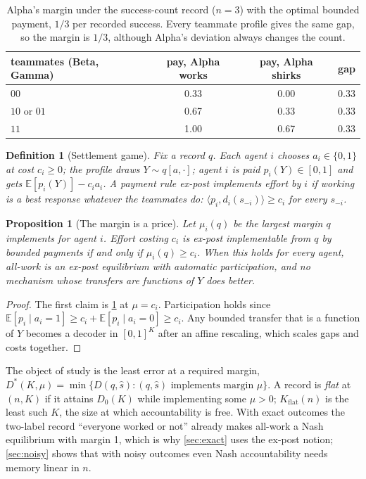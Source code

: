 \documentclass[sigconf,anonymous,acmthm=false]{acmart}
\theoremstyle{acmplain}
\newtheorem{proposition}{Proposition}
\theoremstyle{acmdefinition}
\newtheorem{definition}{Definition}
\newcommand{\E}{\mathbb{E}}
\newcommand{\Kflat}{K_{\mathrm{flat}}}
\newcommand{\shat}{\hat{s}}
\newcommand{\cube}{\{0,1\}}
\newcommand{\A}{\textsf{Alpha}}
\newcommand{\B}{\textsf{Beta}}
\newcommand{\G}{\textsf{Gamma}}
\begin{document}
\begin{table}[t]
\caption{\A's margin under the success-count record ($n=3$) with the optimal bounded
payment, $1/3$ per recorded success. Every teammate profile gives the same gap, so the margin
is $1/3$, although \A's deviation always changes the count.}
\label{tab:alpha}
\footnotesize
\begin{tabular}{@{}lccc@{}}
\toprule
teammates (\B, \G) & pay, \A{} works & pay, \A{} shirks & gap\\
\midrule
$00$ & 0.33 & 0.00 & 0.33\\
$10$ or $01$ & 0.67 & 0.33 & 0.33\\
$11$ & 1.00 & 0.67 & 0.33\\
\bottomrule
\end{tabular}
\end{table}

\begin{definition}[Settlement game]\label{def:game}
Fix a record $q$. Each agent $i$ chooses $a_i\in\cube$ at cost $c_i\ge0$; the profile draws
$Y\sim q[a,\cdot]$; agent $i$ is paid $p_i(Y)\in[0,1]$ and gets $\E[p_i(Y)]-c_ia_i$. A payment
rule \emph{ex-post implements} effort by $i$ if working is a best response whatever the
teammates do: $\langle p_i,d_i(s_{-i})\rangle\ge c_i$ for every $s_{-i}$.
\end{definition}

\begin{proposition}[The margin is a price]\label{prop:threshold}
Let $\mu_i(q)$ be the largest margin $q$ implements for agent $i$. Effort costing $c_i$ is
ex-post implementable from $q$ by bounded payments if and only if $\mu_i(q)\ge c_i$. When
this holds for every agent, all-work is an ex-post equilibrium with automatic participation,
and no mechanism whose transfers are functions of $Y$ does better.
\end{proposition}
\begin{proof}
The first claim is \cref{def:game} at $\mu=c_i$. Participation holds since
$\E[p_i\mid a_i=1]\ge c_i+\E[p_i\mid a_i=0]\ge c_i$. Any bounded transfer that is a function
of $Y$ becomes a decoder in $[0,1]^K$ after an affine rescaling, which scales gaps and costs
together.
\end{proof}

The object of study is the least error at a required margin,
$D^*(K,\mu)=\min\{D(q,\shat):(q,\shat)\text{ implements margin }\mu\}$. A record is
\emph{flat} at $(n,K)$ if it attains $D_0(K)$ while implementing some $\mu>0$; $\Kflat(n)$ is
the least such $K$, the size at which accountability is free. With exact outcomes the
two-label record ``everyone worked or not'' already makes all-work a Nash equilibrium with
margin 1, which is why \cref{sec:exact} uses the ex-post notion; \cref{sec:noisy} shows
that with noisy outcomes even Nash accountability needs memory linear in $n$.
\end{document}
